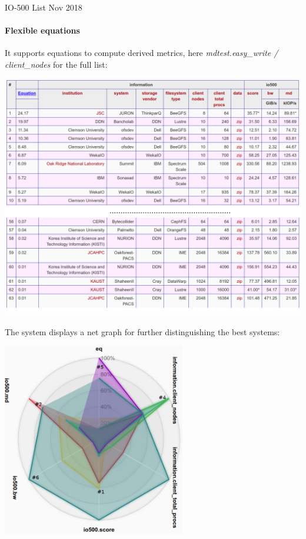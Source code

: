 \documentclass[portrait,a0paper,fontscale=0.4]{baposter}
\begin{document}
\begin{poster}
\begin{posterbox}[name=io500res,column=1,above=bottom,below=io500]{IO-500 List Nov 2018}
\vspace*{-1em}


\paragraph{Flexible equations}

It supports equations to compute derived metrics, here \textit{mdtest.easy\_write / client\_nodes} for the full list:

\includegraphics[width=\textwidth]{io500-sorted}

The system displays a net graph for further distinguishing the best systems:

\vspace*{-1.5em}

\begin{center}
\includegraphics[width=0.6\textwidth]{io-500-net}
\end{center}


\end{posterbox}
\end{poster}
\end{document}

